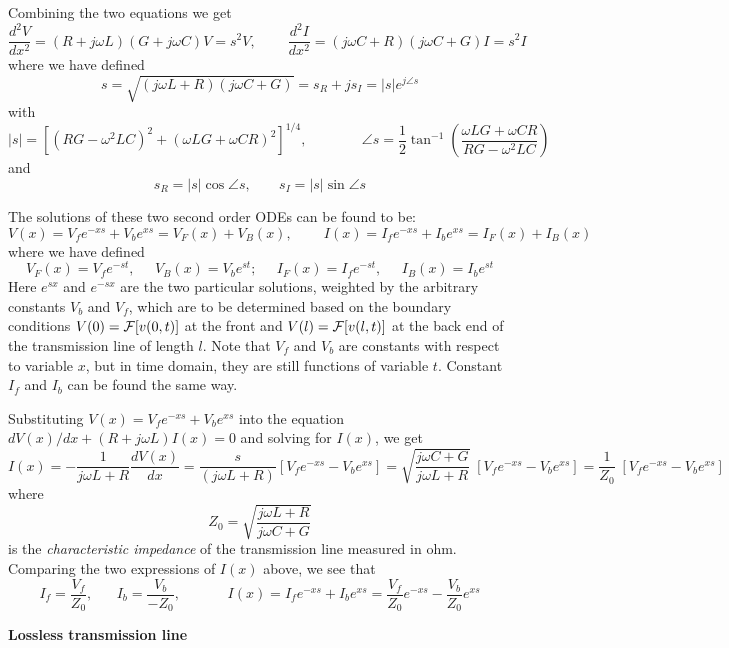 Combining the two equations we get
\[ \frac{d^2V}{dx^2}=(R+j\omega L)(G+j\omega C)V=s^2V,
\;\;\;\;\;\;\;\;
\frac{d^2I}{dx^2}=(j\omega C+R)(j\omega C+G)I=s^2I \]
where we have defined
\[ s=\sqrt{(j\omega L+R)(j\omega C+G)}=s_R+js_I=|s| e^{j\angle s} \]  
with 
\[ |s|=\left[ (RG-\omega^2LC)^2+(\omega LG+\omega CR)^2\right]^{1/4},
\;\;\;\;\;\;\;\;\;\;\;\;\;\;
\angle s=\frac{1}{2}\tan^{-1}\left(\frac{\omega LG+\omega CR}{RG-\omega^2LC}\right)\]
and
\[ s_R=|s|\cos\angle s,\;\;\;\;\;\;\;s_I=|s|\sin\angle s \]

The solutions of these two second order ODEs can be found to be:
\[ V(x)=V_f e^{-xs}+V_b e^{xs}=V_F(x)+V_B(x),
\;\;\;\;\;\;\;\; I(x)=I_f e^{-xs}+I_b e^{xs}=I_F(x)+I_B(x) \]
where we have defined
\[ V_F(x)=V_f e^{-st},\;\;\;\;\;V_B(x)=V_b e^{st};\;\;\;\;\;
I_F(x)=I_f e^{-st},\;\;\;\;\;I_B(x)=I_b e^{st} \]
Here $e^{sx}$ and $e^{-sx}$ are the two particular solutions, weighted by 
the arbitrary constants $V_b$ and $V_f$, which are to be determined based 
on the boundary conditions $V(0)={\cal F}[v(0,t)]$ at the front and 
$V(l)={\cal F}[v(l,t)]$ at the back end of the transmission line of length 
$l$. Note that $V_f$ and $V_b$ are constants with respect to variable $x$, 
but in time domain, they are still functions of variable $t$. Constant $I_f$ 
and $I_b$ can be found the same way.

Substituting $V(x)=V_fe^{-xs}+V_be^{xs}$ into the equation 
$dV(x)/dx+(R+j\omega L)I(x)=0$ and solving for $I(x)$, we get
\[ I(x)=-\frac{1}{j\omega L+R}\frac{dV(x)}{dx}
  =\frac{s}{(j\omega L+R)}[V_f e^{-xs}-V_b e^{xs}]
  =\sqrt{\frac{j\omega C+G}{j\omega L+R}}\;[V_f e^{-xs}-V_b e^{xs}]
  =\frac{1}{Z_0}\;[V_f e^{-xs}-V_b e^{xs}]
\]
where 
\[ Z_0=\sqrt{\frac{j\omega L+R}{j\omega C+G}} \]
is the {\em characteristic impedance} of the transmission line measured in ohm. 
Comparing the two expressions of $I(x)$ above, we see that
\[ I_f=\frac{V_f}{Z_0},\;\;\;\;\;\;I_b=\frac{V_b}{-Z_0},
\;\;\;\;\;\;\;\;\;\;\;\;I(x)=I_f e^{-xs}+I_b e^{xs}
=\frac{V_f}{Z_0}e^{-xs}-\frac{V_b}{Z_0}e^{xs} \]


{\bf Lossless transmission line}

